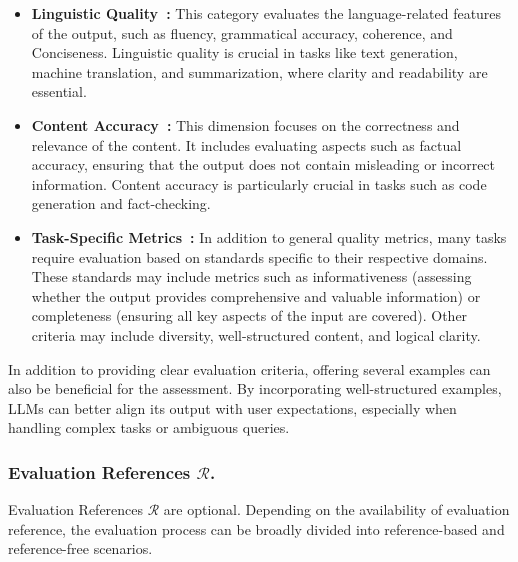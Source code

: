 \begin{itemize}[leftmargin=*]
\item \textbf{Linguistic Quality~\cite{fabbri2021summeval,zhang2018personalizing,chhun2022human}:} This category evaluates the language-related features of the output, such as fluency, grammatical accuracy, coherence, and Conciseness. Linguistic quality is crucial in tasks like text generation, machine translation, and summarization, where clarity and readability are essential.


\item \textbf{Content Accuracy~\cite{chen2021evaluating,jimenez2023swe,tan2024judgebench}:} This dimension focuses on the correctness and relevance of the content. It includes evaluating aspects such as factual accuracy, ensuring that the output does not contain misleading or incorrect information. Content accuracy is particularly crucial in tasks such as code generation and fact-checking.


\item \textbf{Task-Specific Metrics~\cite{ji2024pku,lin2024wildbench,tan2024judgebench}:} In addition to general quality metrics, many tasks require evaluation based on standards specific to their respective domains. These standards may include metrics such as informativeness (assessing whether the output provides comprehensive and valuable information) or completeness (ensuring all key aspects of the input are covered). Other criteria may include diversity, well-structured content, and logical clarity.
\end{itemize}


In addition to providing clear evaluation criteria, offering several examples can also be beneficial for the assessment. By incorporating well-structured examples, LLMs can better align its output with user expectations, especially when handling complex tasks or ambiguous queries.

\subsubsection{Evaluation References $\mathcal{R}$.}
Evaluation References $\mathcal{R}$ are optional. Depending on the availability of evaluation reference, the evaluation process can be broadly divided into reference-based and reference-free scenarios.


